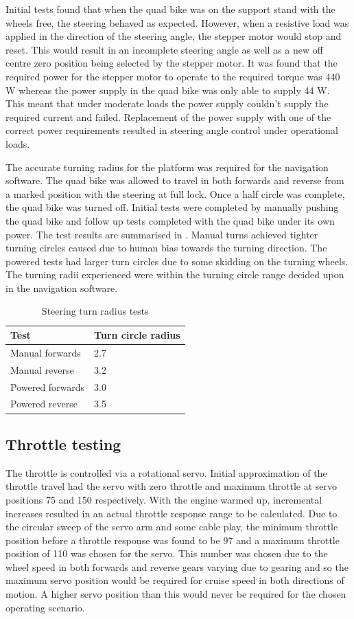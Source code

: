 \documentclass[main.tex]{subfiles}
\begin{document}
Initial tests found that when the quad bike was on the support stand with the wheels free, the steering behaved as expected. However, when a resistive load was applied in the direction of the steering angle, the stepper motor would stop and reset. This would result in an incomplete steering angle as well as a new off centre zero position being selected by the stepper motor.  It was found that the required power for the stepper motor to operate to the required torque was 440 W whereas the power supply in the quad bike was only able to supply 44 W. This meant that under moderate loads the power supply couldn't supply the required current and failed. Replacement of the power supply with one of the correct power requirements resulted in steering angle control under operational loads.

The accurate turning radius for the platform was required for the navigation software. The quad bike was allowed to travel in both forwards and reverse from a marked position with the steering at full lock. Once a half circle was complete, the quad bike was turned off. Initial tests were completed by manually pushing the quad bike and follow up tests completed with the quad bike under its own power. The test results are summarised in . Manual turns achieved tighter turning circles caused due to human bias towards the turning direction. The powered tests had larger turn circles due to some skidding on the turning wheels. The turning radii experienced were within the turning circle range decided upon in the navigation software.
\begin{table}[ht]
\centering
\caption{Steering turn radius tests}
\begin{tabular}{ll}
\toprule
Test & Turn circle radius \\ \midrule
Manual forwards & 2.7 \\
Manual reverse & 3.2 \\
Powered forwards & 3.0 \\
Powered reverse & 3.5 \\ \bottomrule
\end{tabular}
\end{table}

\subsection{Throttle testing}
The throttle is controlled via a rotational servo. Initial approximation of the throttle travel had the servo with zero throttle and maximum throttle at servo positions 75 and 150 respectively. With the engine warmed up, incremental increases resulted in an actual throttle response range to be calculated. Due to the circular sweep of the servo arm and some cable play, the minimum throttle position before a throttle response was found to be 97 and a maximum throttle position of 110 was chosen for the servo. This number was chosen due to the wheel speed in both forwards and reverse gears varying due to gearing and so the maximum servo position would be required for cruise speed in both directions of motion. A higher servo position than this would never be required for the chosen operating scenario.
\end{document}
